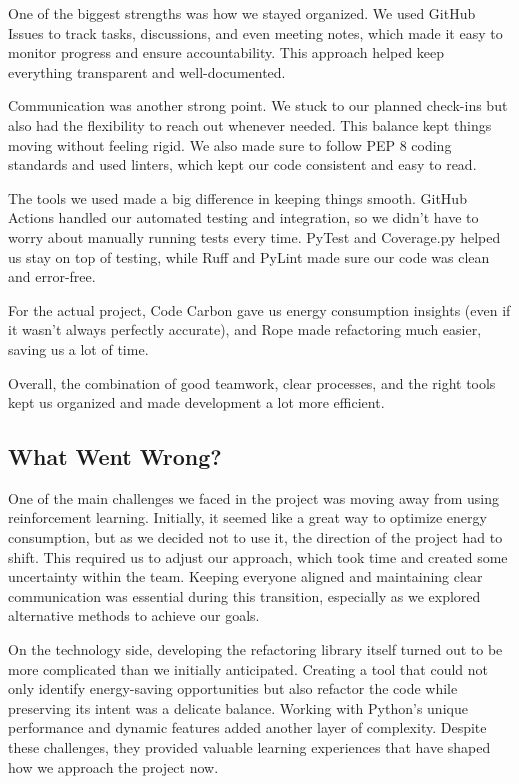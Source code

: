 \documentclass{article}
\begin{document}

One of the biggest strengths was how we stayed organized. We used GitHub Issues to track 
tasks, discussions, and even meeting notes, which made it easy to monitor progress and 
ensure accountability. This approach helped keep everything transparent and well-documented.

Communication was another strong point. We stuck to our planned check-ins but also had 
the flexibility to reach out whenever needed. This balance kept things moving without 
feeling rigid. We also made sure to follow PEP 8 coding standards and used linters, 
which kept our code consistent and easy to read.

The tools we used made a big difference in keeping things smooth. GitHub Actions handled 
our automated testing and integration, so we didn’t have to worry about manually running 
tests every time. PyTest and Coverage.py helped us stay on top of testing, while Ruff and 
PyLint made sure our code was clean and error-free.

For the actual project, Code Carbon gave us energy consumption insights (even if it 
wasn’t always perfectly accurate), and Rope made refactoring much easier, saving us a lot of time.

Overall, the combination of good teamwork, clear processes, and the right tools kept us 
organized and made development a lot more efficient.

\subsection{What Went Wrong?}


One of the main challenges we faced in the project was moving away from using 
reinforcement learning. Initially, it seemed like a great way to optimize energy 
consumption, but as we decided not to use it, the direction of the project had to 
shift. This required us to adjust our approach, which took time and created some 
uncertainty within the team. Keeping everyone aligned and maintaining clear 
communication was essential during this transition, especially as we explored 
alternative methods to achieve our goals.

On the technology side, developing the refactoring library itself turned out to 
be more complicated than we initially anticipated. Creating a tool that could not 
only identify energy-saving opportunities but also refactor the code while preserving 
its intent was a delicate balance. Working with Python's unique performance and 
dynamic features added another layer of complexity. Despite these challenges, they 
provided valuable learning experiences that have shaped how we approach the project now.
\end{document}
